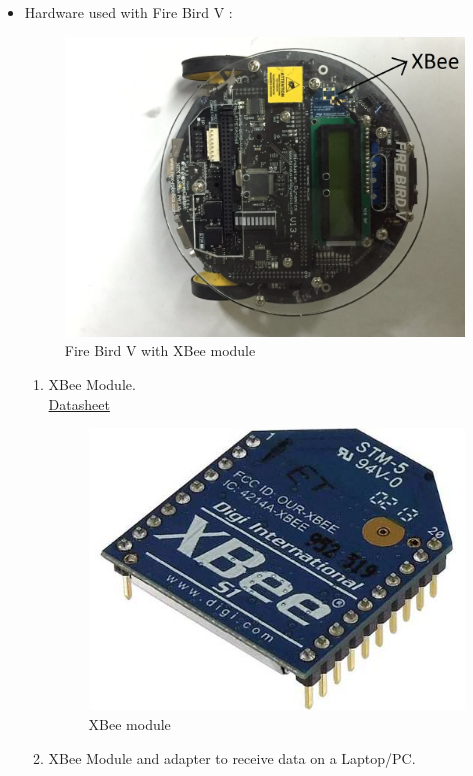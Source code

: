 \documentclass[a4paper,12pt,oneside]{book}
\begin{document}
\begin{itemize}
  \item Hardware used with Fire Bird V :
  \\
  \begin{figure}[h]
        \centering
        \includegraphics[scale=0.2]{firebird_V}
        \caption{Fire Bird V with XBee module}
      \end{figure}

  \begin{enumerate}
    \item XBee Module.\\
    \href{https://www.sparkfun.com/datasheets/Wireless/Zigbee/XBee-Datasheet.pdf}{ Datasheet}
    \begin{figure}[h]
        \centering
        \includegraphics[scale=0.35]{XBee.jpg}
        \caption{XBee module}
      \end{figure}
      \newpage
    \item XBee Module and adapter to receive data on a Laptop/PC.\par


\end{enumerate}
\end{itemize}
\end{document}
